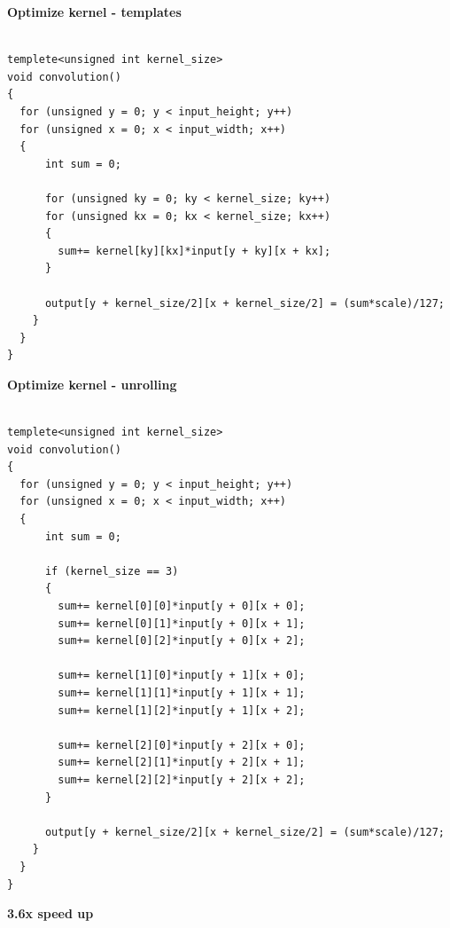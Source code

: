 \documentclass[xcolor=dvipsnames]{beamer}
\begin{document}
\begin{frame}[fragile]
{\bf Optimize kernel - templates}


\begin{lstlisting}

templete<unsigned int kernel_size>
void convolution()
{
  for (unsigned y = 0; y < input_height; y++)
  for (unsigned x = 0; x < input_width; x++)
  {
      int sum = 0;

      for (unsigned ky = 0; ky < kernel_size; ky++)
      for (unsigned kx = 0; kx < kernel_size; kx++)
      {
        sum+= kernel[ky][kx]*input[y + ky][x + kx];
      }

      output[y + kernel_size/2][x + kernel_size/2] = (sum*scale)/127;
    }
  }
}
\end{lstlisting}
\end{frame}





\begin{frame}[fragile]
{\bf Optimize kernel - unrolling}


\begin{lstlisting}

templete<unsigned int kernel_size>
void convolution()
{
  for (unsigned y = 0; y < input_height; y++)
  for (unsigned x = 0; x < input_width; x++)
  {
      int sum = 0;

      if (kernel_size == 3)
      {
        sum+= kernel[0][0]*input[y + 0][x + 0];
        sum+= kernel[0][1]*input[y + 0][x + 1];
        sum+= kernel[0][2]*input[y + 0][x + 2];

        sum+= kernel[1][0]*input[y + 1][x + 0];
        sum+= kernel[1][1]*input[y + 1][x + 1];
        sum+= kernel[1][2]*input[y + 1][x + 2];

        sum+= kernel[2][0]*input[y + 2][x + 0];
        sum+= kernel[2][1]*input[y + 2][x + 1];
        sum+= kernel[2][2]*input[y + 2][x + 2];
      }

      output[y + kernel_size/2][x + kernel_size/2] = (sum*scale)/127;
    }
  }
}
\end{lstlisting}

{\bf 3.6x speed up}

\end{frame}
\end{document}
